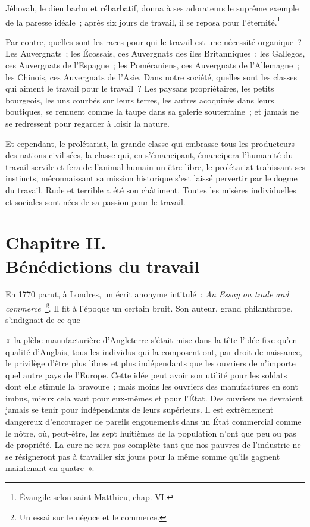 \documentclass[french,twoside]{book} %
\newenvironment{quoteblock}%
  {\begin{quoting}}
  {\end{quoting}}
\newcommand\chapteropen{} %
\newcommand\chaptercont{} %
\newcommand\chapterclose{} %
\newenvironment{quotebar}{%
    \def\FrameCommand{{\color{rubric!10!}\vrule width 0.5em} \hspace{0.9em}}%
    \def\OuterFrameSep{\itemsep} %
    \MakeFramed {\advance\hsize-\width \FrameRestore}
  }%
  {%
    \endMakeFramed
  }
\renewenvironment{quoteblock}%
  {%
    \savenotes
    \setstretch{0.9}
    \normalfont
    \begin{quotebar}
  }
  {%
    \end{quotebar}
    \spewnotes
  }
\begin{document}
\noindent Jéhovah, le dieu barbu et rébarbatif, donna à ses adorateurs le suprême exemple de la paresse idéale ; après six jours de travail, il se reposa pour l’éternité.\footnote{Évangile selon saint Matthieu, chap. VI.}\par
Par contre, quelles sont les races pour qui le travail est une nécessité organique ? Les Auvergnats ; les Écossais, ces Auvergnats des îles Britanniques ; les Gallegos, ces Auvergnats de l’Espagne ; les Poméraniens, ces Auvergnats de l’Allemagne ; les Chinois, ces Auvergnats de l’Asie. Dans notre société, quelles sont les classes qui aiment le travail pour le travail ? Les paysans propriétaires, les petits bourgeois, les uns courbés sur leurs terres, les autres acoquinés dans leurs boutiques, se remuent comme la taupe dans sa galerie souterraine ; et jamais ne se redressent pour regarder à loisir la nature.\par
Et cependant, le prolétariat, la grande classe qui embrasse tous les producteurs des nations civilisées, la classe qui, en s’émancipant, émancipera l’humanité du travail servile et fera de l’animal humain un être libre, le prolétariat trahissant ses instincts, méconnaissant sa mission historique s’est laissé pervertir par le dogme du travail. Rude et terrible a été son châtiment. Toutes les misères individuelles et sociales sont nées de sa passion pour le travail.
\chapterclose


\chapteropen
\chapter[{Chapitre II. Bénédictions du travail}]{Chapitre II. \\
Bénédictions du travail}\renewcommand{\leftmark}{Chapitre II. \\
Bénédictions du travail}


\chaptercont
\noindent En 1770 parut, à Londres, un écrit anonyme intitulé : \emph{An Essay on trade and commerce \footnote{Un essai sur le négoce et le commerce.}}. Il fit à l’époque un certain bruit. Son auteur, grand philanthrope, s’indignait de ce que\par

\begin{quoteblock}
 \noindent « la plèbe manufacturière d’Angleterre s’était mise dans la tête l’idée fixe qu’en qualité d’Anglais, tous les individus qui la composent ont, par droit de naissance, le privilège d’être plus libres et plus indépendants que les ouvriers de n’importe quel autre pays de l’Europe. Cette idée peut avoir son utilité pour les soldats dont elle stimule la bravoure ; mais moins les ouvriers des manufactures en sont imbus, mieux cela vaut pour eux-mêmes et pour l’État. Des ouvriers ne devraient jamais se tenir pour indépendants de leurs supérieurs. Il est extrêmement dangereux d’encourager de pareils engouements dans un État commercial comme le nôtre, où, peut-être, les sept huitièmes de la population n’ont que peu ou pas de propriété. La cure ne sera pas complète tant que nos pauvres de l’industrie ne se résigneront pas à travailler six jours pour la même somme qu’ils gagnent maintenant en quatre ».
\end{quoteblock}
\end{document}
